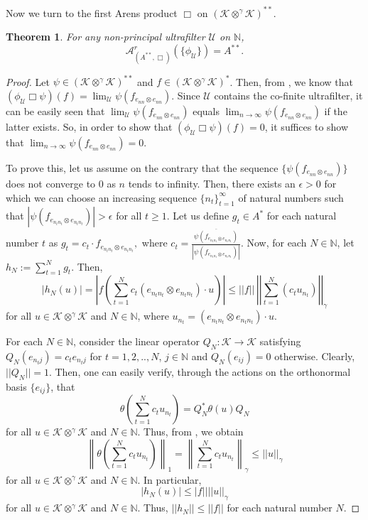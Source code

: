 \documentclass[a4]{amsart}
\theoremstyle{cupthm}
\newtheorem{thm}{Theorem}[section]
\theoremstyle{cupdefn}
\theoremstyle{cuprem}
\numberwithin{equation}{section}
\newcommand{\ot}{\otimes}
\newcommand{\obp}{\otimes^{\gamma}}
\newcommand{\N}{\mathbb N}
\newcommand{\mK}{\mathcal{K}}
\begin{document}
Now we turn to the first Arens product $\Box$ on $(\mK \obp
\mK)^{**}$.
\begin{thm}\label{ann-box}
	For any non-principal ultrafilter $\mathcal U$ on $\mathbb
        N$, $$\mathcal{A}^r_{(A^{**},\Box)}\left(\{\phi_{\mathcal
          U}\}\right)=A^{**}.$$
	\end{thm}
\begin{proof}
Let $\psi\in (\mK \obp \mK)^{**}$ and $f\in (\mathcal K\obp\mathcal
K)^{*}$. Then, from , we know that $(\phi_{\mathcal U}
\Box \psi)(f) = \lim_{\mathcal{ U}} \psi(f_{e_{nn} \ot e_{nn}})$.
Since $\mathcal{U}$ contains the co-finite ultrafilter, it can be
easily seen that $\lim_{\mathcal{ U}} \psi(f_{e_{nn} \ot e_{nn}})$ equals
$\lim_{n\to \infty} \psi(f_{e_{nn} \ot e_{nn}})$ if the latter exists. So, in
order to show that $ (\phi_{\mathcal U}\Box \psi)(f)=0 $, it suffices
to show that $\lim_{n\to \infty}\psi(f_{ e_{nn} \otimes e_{nn}}) =0$.

To prove this, let us assume on the contrary that the sequence
$\{\psi(f_{e_{nn} \otimes e_{nn}})\}$ does not converge to $0$ as $n$
tends to infinity. Then, there exists an $\epsilon>0$ for which we can choose an
increasing sequence $\{n_t\}_{t=1}^\infty$ of natural numbers such
that $|\psi(f_{ e_{n_tn_t} \otimes e_{n_tn_t}})|>\epsilon$ for all $t
\geq 1$.  Let us define $g_{t}\in A^*$ for each natural number $t$ as
$g_{t}=c_{t}\cdot f_{ e_{n_tn_t}\otimes e_{n_tn_t}},$ where
$c_t=\frac{\overline{\psi(f_{ e_{n_tn_t} \otimes
      e_{n_tn_t}})}}{\left\vert\psi(f_{e_{n_tn_t} \otimes
    e_{n_tn_t}})\right\vert}$. Now, for each $N \in \N$, let
$h_N:=\sum_{t=1}^Ng_{t}$. Then,
\[
	|h_N(u)| = \left\vert f\left (\sum_{t=1}^N c_t(
        e_{n_tn_t}\otimes e_{n_tn_t})\cdot u\right)\right\vert \leq
        ||f||\,
        \left\vert\left\vert\sum_{t=1}^N(c_tu_{n_t})\right\vert\right\vert_{\gamma}
\]
for all $u \in \mK\obp \mK$ and $N \in \N$, where $u_{n_t}=(e_{n_tn_t}\otimes e_{n_tn_t})\cdot u$.

For each $N \in \N$, consider the linear operator $Q_N:\mathcal K\to
\mathcal K$ satisfying $Q_N(e_{n_tj})=c_t e_{n_tj}$ for $t=1,2,..,N$,
$j\in \mathbb N$ and $Q_N(e_{ij})=0$ otherwise. Clearly,
$||Q_N||=1$. Then, one can easily verify, through the actions on the
orthonormal basis $\{e_{ij}\}$, that
\[
\theta\left(\sum_{t=1}^Nc_tu_{n_t}\right)=Q_N^*\theta(u)Q_N
\]
for all $u \in \mK \obp \mK$ and $N \in \N$. Thus, from ,
we obtain
\[
\left\|\theta\left(\sum_{t=1}^Nc_tu_{n_t}\right)\right\|_1=\left\|\sum_{t=1}^Nc_tu_{n_t}\right\|_\gamma\leq
||u||_\gamma
\]
for all $u \in \mK \obp \mK$ and $N \in \N$. In particular,
\[
  |h_N(u)|\leq |f||||u||_\gamma
  \]
  for all $u \in \mK\obp \mK$ and $N \in \N$.  Thus, $||h_N||\leq
  ||f||$ for each natural number $N$.


\end{proof}
\end{document}
